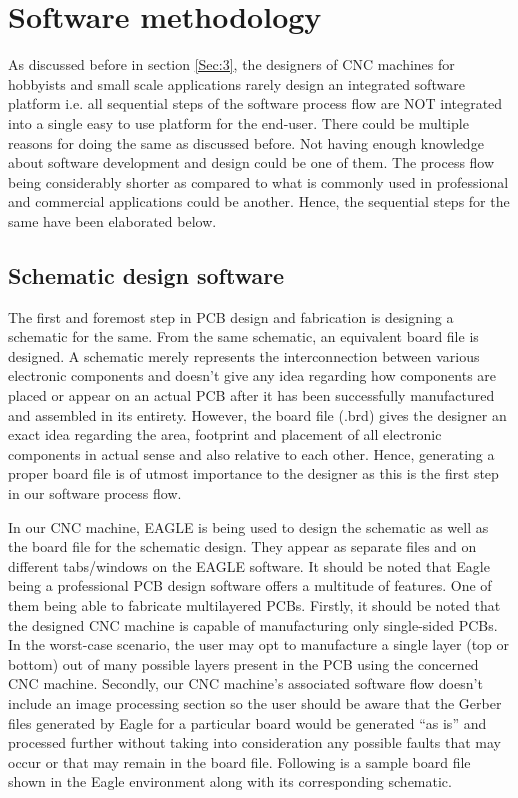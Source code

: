 \chapter{Software methodology} \label{chapter5}

As discussed before in section \ref{Sec:3}, the designers of CNC machines for hobbyists and small scale applications rarely design an integrated software platform i.e. all sequential steps of the software process flow are NOT integrated into a single easy to use platform for the end-user. There could be multiple reasons for doing the same as discussed before. Not having enough knowledge about software development and design could be one of them. The process flow being considerably shorter as compared to what is commonly used in professional and commercial applications could be another. Hence, the sequential steps for the same have been elaborated below.

\section{Schematic design software}

The first and foremost step in PCB design and fabrication is designing a schematic for the same. From the same schematic, an equivalent board file is designed. A schematic merely represents the interconnection between various electronic components and doesn’t give any idea regarding how components are placed or appear on an actual PCB after it has been successfully manufactured and assembled in its entirety. However, the board file (.brd) gives the designer an exact idea regarding the area, footprint and placement of all electronic components in actual sense and also relative to each other. Hence, generating a proper board file is of utmost importance to the designer as this is the first step in our software process flow. \par

In our CNC machine, EAGLE \textsuperscript{\textregistered} is being used to design the schematic as well as the board file for the schematic design. They appear as separate files and on different tabs/windows on the EAGLE software.  It should be noted that Eagle being a professional PCB design software offers a multitude of features. One of them being able to fabricate multilayered PCBs. Firstly, it should be noted that the designed CNC machine is capable of manufacturing only single-sided PCBs. In the worst-case scenario, the user may opt to manufacture a single layer (top or bottom) out of many possible layers present in the PCB using the concerned CNC machine. Secondly, our CNC machine’s associated software flow doesn’t include an image processing section so the user should be aware that the Gerber files generated by Eagle for a particular board would be generated “as is” and processed further without taking into consideration any possible faults that may occur or that may remain in the board file. Following is a sample board file shown in the Eagle environment along with its corresponding schematic. \par


